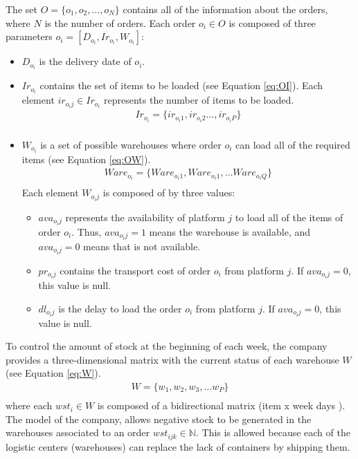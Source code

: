 \documentclass[letterpaper]{article} %
\begin{document}
The set $O = \{o_1, o_2, \dots, o_N \}$ contains all of the information about the orders, where $N$ is the number of orders. Each order $o_i \in O$ is composed of three parameters $o_i =[D_{o_i},Ir_{o_i},W_{o_i}]$:
\begin{itemize}
    \item $D_{o_i}$ is the delivery date of $o_i$.
    \item $Ir_{o_i}$ contains the set of items to be loaded (see Equation \ref{eq:OI}). Each element $ir_{o_{i}j} \in Ir_{o_i}$ represents the number of items to be loaded.
    \begin{equation}\label{eq:OI}
        \begin{aligned}
            Ir_{o_{i}} = \{ ir_{o_{i}1}, ir_{o_{i}2} \dots, ir_{o_{i}P} \} \\
        \end{aligned}
    \end{equation}
    \item $W_{o_i}$ is a set of possible warehouses where order $o_i$ can load all of the required items (see Equation \ref{eq:OW}).
    \begin{equation} \label{eq:OW}
        \begin{aligned}
            Ware_{o_i} = \{ Ware_{o_{i}1}, Ware_{o_{i}1}, \dots Ware_{o_{i}Q} \}\\
        \end{aligned}
    \end{equation}
    Each element $W_{o_{i}j}$ is composed of by three values:
    \begin{itemize}
        \item $ava_{o_{i}j}$ represents the availability of platform $j$ to load all of the items of order $o_i$. Thus, $ava_{o_{i}j}=1$  means the warehouse is available, and $ava_{o_{i}j}=0$ means that is not available.
        \item $pr_{o_{i}j}$ contains the transport cost of order $o_i$ from platform $j$. If $ava_{o_{i}j}=0$, this value is null.
        \item $dl_{o_{i}j}$ is the delay to load the order $o_i$ from platform $j$. If $ava_{o_{i}j}=0$, this value is null.
    \end{itemize}
\end{itemize}

To control the amount of stock at the beginning of each week, the company provides a three-dimensional matrix with the current status of each warehouse $W$ (see Equation \ref{eq:W}).
\begin{equation}
    \begin{aligned}\label{eq:W}
        W = \{w_1, w_2, w_3, \dots w_P \}\\
    \end{aligned}
\end{equation}
where each $wst_i \in W$ is composed of a bidirectional matrix (item x week days ). The model of the company, allows negative stock to be generated in the warehouses associated to an order $wst_{ijk} \in \mathbb{N} $. This is allowed because each of the logistic centers (warehouses) can replace the lack of containers by shipping them.
\end{document}
